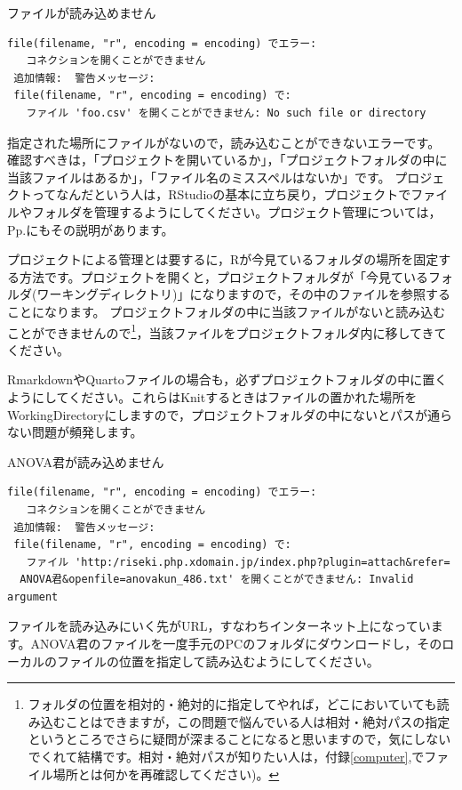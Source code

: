 \documentclass{ltjsbook}
\begin{document}
\begin{FAQ}{ファイルが読み込めません}{}
	\begin{verbatim}
file(filename, "r", encoding = encoding) でエラー:
   コネクションを開くことができません
 追加情報:  警告メッセージ:
 file(filename, "r", encoding = encoding) で:
   ファイル 'foo.csv' を開くことができません: No such file or directory
    \end{verbatim}
	指定された場所にファイルがないので，読み込むことができないエラーです。
	確認すべきは，「プロジェクトを開いているか」，「プロジェクトフォルダの中に当該ファイルはあるか」，「ファイル名のミススペルはないか」です。
	プロジェクトってなんだという人は，RStudioの基本に立ち戻り，プロジェクトでファイルやフォルダを管理するようにしてください。プロジェクト管理については，Pp.\pageref{UnderProject}にもその説明があります。

	プロジェクトによる管理とは要するに，Rが今見ているフォルダの場所を固定する方法です。プロジェクトを開くと，プロジェクトフォルダが「今見ているフォルダ(ワーキングディレクトリ)」になりますので，その中のファイルを参照することになります。
	プロジェクトフォルダの中に当該ファイルがないと読み込むことができませんので\footnote{フォルダの位置を相対的・絶対的に指定してやれば，どこにおいていても読み込むことはできますが，この問題で悩んでいる人は相対・絶対パスの指定というところでさらに疑問が深まることになると思いますので，気にしないでくれて結構です。相対・絶対パスが知りたい人は，付録\ref{computer},\pageref{setLocation}でファイル場所とは何かを再確認してください)。}，当該ファイルをプロジェクトフォルダ内に移してきてください。

	RmarkdownやQuartoファイルの場合も，必ずプロジェクトフォルダの中に置くようにしてください。これらはKnitするときはファイルの置かれた場所をWorkingDirectoryにしますので，プロジェクトフォルダの中にないとパスが通らない問題が頻発します。
\end{FAQ}

\begin{FAQ}{ANOVA君が読み込めません}{}
	\begin{verbatim}
file(filename, "r", encoding = encoding) でエラー:
   コネクションを開くことができません
 追加情報:  警告メッセージ:
 file(filename, "r", encoding = encoding) で:
   ファイル 'http:/riseki.php.xdomain.jp/index.php?plugin=attach&refer=
  ANOVA君&openfile=anovakun_486.txt' を開くことができません: Invalid argument
\end{verbatim}
	ファイルを読み込みにいく先がURL，すなわちインターネット上になっています。ANOVA君のファイルを一度手元のPCのフォルダにダウンロードし，そのローカルのファイルの位置を指定して読み込むようにしてください。
\end{FAQ}
\end{document}
